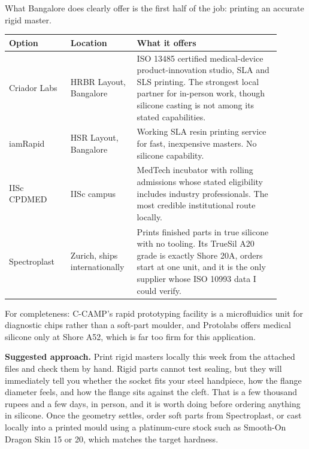 \documentclass[11pt]{article}
\begin{document}
What Bangalore does clearly offer is the first half of the job: printing an accurate rigid master.

\vspace{0.4em}
\begin{center}
\small
\begin{tabular}{@{}p{0.21\linewidth}p{0.20\linewidth}p{0.49\linewidth}@{}}
\toprule
\textbf{Option} & \textbf{Location} & \textbf{What it offers} \\
\midrule
Criador Labs & HRBR Layout, Bangalore & ISO 13485 certified medical-device product-innovation studio, SLA and SLS printing. The strongest local partner for in-person work, though silicone casting is not among its stated capabilities. \\
\addlinespace
iamRapid & HSR Layout, Bangalore & Working SLA resin printing service for fast, inexpensive masters. No silicone capability. \\
\addlinespace
IISc CPDMED & IISc campus & MedTech incubator with rolling admissions whose stated eligibility includes industry professionals. The most credible institutional route locally. \\
\addlinespace
Spectroplast & Zurich, ships internationally & Prints finished parts in true silicone with no tooling. Its TrueSil A20 grade is exactly Shore 20A, orders start at one unit, and it is the only supplier whose ISO 10993 data I could verify. \\
\bottomrule
\end{tabular}
\end{center}
\vspace{0.6em}

\noindent For completeness: C-CAMP's rapid prototyping facility is a microfluidics unit for diagnostic chips rather than a soft-part moulder, and Protolabs offers medical silicone only at Shore A52, which is far too firm for this application.

\textbf{Suggested approach.} Print rigid masters locally this week from the attached files and check them by hand. Rigid parts cannot test sealing, but they will immediately tell you whether the socket fits your steel handpiece, how the flange diameter feels, and how the flange sits against the cleft. That is a few thousand rupees and a few days, in person, and it is worth doing before ordering anything in silicone. Once the geometry settles, order soft parts from Spectroplast, or cast locally into a printed mould using a platinum-cure stock such as Smooth-On Dragon Skin 15 or 20, which matches the target hardness.
\end{document}
